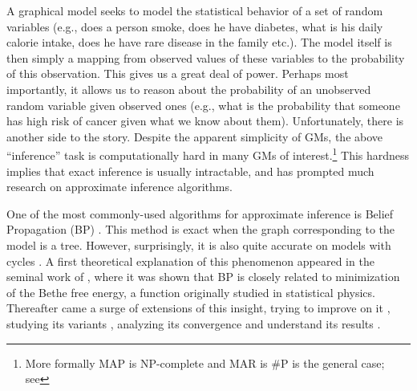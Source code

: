 A graphical model seeks to model the statistical behavior of a set of random variables (e.g., does a person smoke, does he have diabetes, what is his daily calorie intake, does he have rare disease in the family etc.). %
 The model itself is then simply a mapping from observed values of these variables to the probability of this observation. This gives us a great deal of power. Perhaps most importantly, it allows us to reason about the probability of an unobserved random variable given observed ones (e.g., what is the probability that someone has high risk of cancer given what we know about them). Unfortunately, there is another side to the story. Despite the apparent simplicity of GMs, the above ``inference'' task is computationally hard in many GMs of interest.\footnote{More formally MAP is NP-complete and MAR is \#P is the general case; see } This hardness implies that exact inference is usually intractable, and has prompted much research on approximate inference algorithms.

One of the most commonly-used algorithms for approximate inference is Belief Propagation (BP)  \cite{pearl1986fusion}.
This method is exact when the graph corresponding to the model is a tree. However, surprisingly, it is also quite accurate on models with cycles  \cite{willsky2002multiresolution,loeliger2004introduction,kschischang2003codes}.
 A first theoretical explanation of this phenomenon appeared in the seminal work of  \cite{yedidia2000generalized}, where it was shown that BP is closely related to minimization of the Bethe free energy, a function originally studied in statistical physics. Thereafter came a surge of extensions of this insight, trying to improve on it  \cite{elidan2012residual}, studying its variants  \cite{welling2001belief, wainwright2003tree, meshi2009convexifying}, analyzing its convergence  \cite{tatikonda2002loopy, mooij2007sufficient, roosta2008convergence} and understand its results  \cite{heskes2002stable, yedidia2005constructing, AlanNips2007, YusukeNips2009, RuozziNips2012}.

